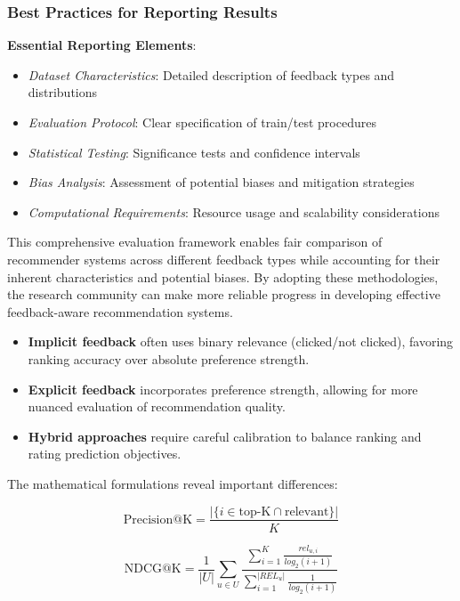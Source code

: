 \subsubsection{Best Practices for Reporting Results}

\textbf{Essential Reporting Elements}:
\begin{itemize}
    \item \textit{Dataset Characteristics}: Detailed description of feedback types and distributions
    \item \textit{Evaluation Protocol}: Clear specification of train/test procedures
    \item \textit{Statistical Testing}: Significance tests and confidence intervals
    \item \textit{Bias Analysis}: Assessment of potential biases and mitigation strategies
    \item \textit{Computational Requirements}: Resource usage and scalability considerations
\end{itemize}

This comprehensive evaluation framework enables fair comparison of recommender systems across different feedback types while accounting for their inherent characteristics and potential biases. By adopting these methodologies, the research community can make more reliable progress in developing effective feedback-aware recommendation systems.

\begin{itemize}
    \item \textbf{Implicit feedback} often uses binary relevance (clicked/not clicked), favoring ranking accuracy over absolute preference strength.
    \item \textbf{Explicit feedback} incorporates preference strength, allowing for more nuanced evaluation of recommendation quality.
    \item \textbf{Hybrid approaches} require careful calibration to balance ranking and rating prediction objectives.
\end{itemize}

The mathematical formulations reveal important differences:

\begin{equation}
\text{Precision@K} = \frac{|\{i \in \text{top-K} \cap \text{relevant}\}|}{K}
\label{eq:precision_k}
\end{equation}

\begin{equation}
\text{NDCG@K} = \frac{1}{|U|} \sum_{u \in U} \frac{\sum_{i=1}^K \frac{rel_{u,i}}{log_2(i+1)}}{\sum_{i=1}^{|REL_u|} \frac{1}{log_2(i+1)}}
\label{eq:ndcg_k}
\end{equation}


